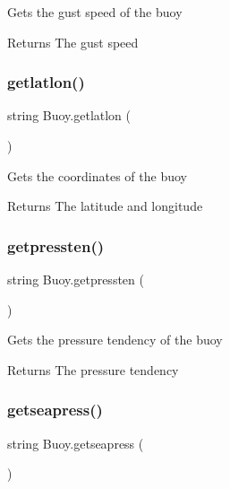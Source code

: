 Gets the gust speed of the buoy \begin{DoxyReturn}{Returns}
The gust speed 
\end{DoxyReturn}
\mbox{\label{class_buoy_ace0fbd097bbdd61b32d46e524b93f2eb}} 
\subsubsection{\texorpdfstring{getlatlon()}{getlatlon()}}
{\footnotesize\ttfamily string Buoy.\+getlatlon (\begin{DoxyParamCaption}{ }\end{DoxyParamCaption})\hspace{0.3cm}{\ttfamily [inline]}}

Gets the coordinates of the buoy \begin{DoxyReturn}{Returns}
The latitude and longitude 
\end{DoxyReturn}
\mbox{\label{class_buoy_ad54dfe539e30d1557b315646e1cb36bd}} 
\subsubsection{\texorpdfstring{getpressten()}{getpressten()}}
{\footnotesize\ttfamily string Buoy.\+getpressten (\begin{DoxyParamCaption}{ }\end{DoxyParamCaption})\hspace{0.3cm}{\ttfamily [inline]}}

Gets the pressure tendency of the buoy \begin{DoxyReturn}{Returns}
The pressure tendency 
\end{DoxyReturn}
\mbox{\label{class_buoy_a487ea32a868903d7239975dd52953c70}} 
\subsubsection{\texorpdfstring{getseapress()}{getseapress()}}
{\footnotesize\ttfamily string Buoy.\+getseapress (\begin{DoxyParamCaption}{ }\end{DoxyParamCaption})\hspace{0.3cm}{\ttfamily [inline]}}

